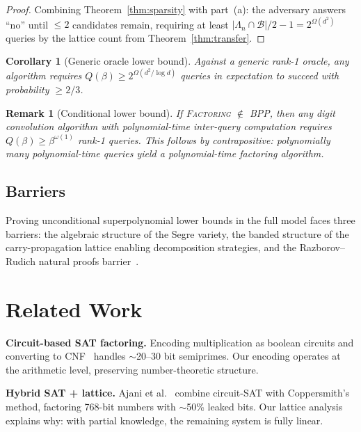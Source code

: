 \documentclass[11pt,a4paper]{article}
\newtheorem{corollary}[theorem]{Corollary}
\newtheorem{remark}{Remark}
\begin{document}
\begin{proof}
Combining Theorem~\ref{thm:sparsity} with part~(a): the adversary answers ``no'' until $\le 2$ candidates remain, requiring at least $|\Lambda_n \cap \mathcal{B}|/2 - 1 = 2^{\Omega(d^2)}$ queries by the lattice count from Theorem~\ref{thm:transfer}.
\end{proof}

\begin{corollary}[Generic oracle lower bound]\label{thm:generic}
Against a generic rank-1 oracle, any algorithm requires $Q(\beta) \ge 2^{\Omega(d^2/\log d)}$ queries in expectation to succeed with probability $\ge 2/3$.
\end{corollary}

\begin{remark}[Conditional lower bound]\label{thm:cond}
If \textnormal{\textsc{Factoring}} $\notin$ BPP, then any digit convolution algorithm with polynomial-time inter-query computation requires $Q(\beta) \ge \beta^{\omega(1)}$ rank-1 queries.  This follows by contrapositive: polynomially many polynomial-time queries yield a polynomial-time factoring algorithm.
\end{remark}

\subsection{Barriers}

Proving unconditional superpolynomial lower bounds in the full model faces three barriers: the algebraic structure of the Segre variety, the banded structure of the carry-propagation lattice enabling decomposition strategies, and the Razborov--Rudich natural proofs barrier~\cite{rr97}.

\section{Related Work}

\textbf{Circuit-based SAT factoring.} Encoding multiplication as boolean circuits and converting to CNF~\cite{yurichev,satfactor} handles ${\sim}$20--30 bit semiprimes. Our encoding operates at the arithmetic level, preserving number-theoretic structure.

\textbf{Hybrid SAT + lattice.} Ajani et al.~\cite{ajani24} combine circuit-SAT with Coppersmith's method, factoring 768-bit numbers with ${\sim}$50\% leaked bits. Our lattice analysis explains why: with partial knowledge, the remaining system is fully linear.
\end{document}
